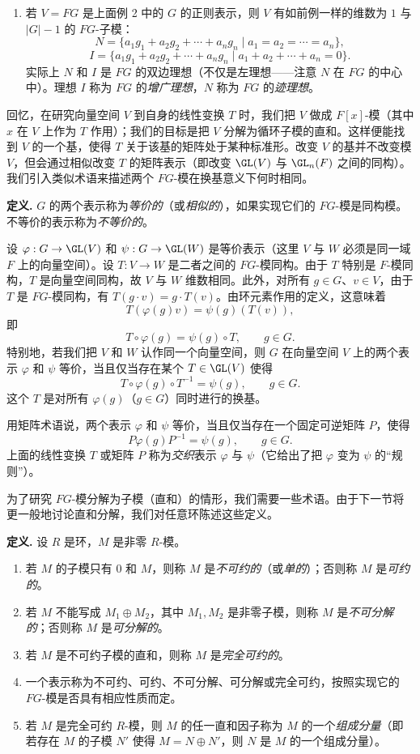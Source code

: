 \begin{enumerate}[label=(\arabic*)]
  \item 若 $V=FG$ 是上面例 2 中的 $G$ 的正则表示，则 $V$ 有如前例一样的维数为 $1$ 与 $|G|-1$ 的 $FG$-子模：
  \[
    N=\{a_1g_1+a_2g_2+\cdots+a_ng_n\mid a_1=a_2=\cdots=a_n\},
  \]
  \[
    I=\{a_1g_1+a_2g_2+\cdots+a_ng_n\mid a_1+a_2+\cdots+a_n=0\}.
  \]
  实际上 $N$ 和 $I$ 是 $FG$ 的双边理想（不仅是左理想——注意 $N$ 在 $FG$ 的中心中）。理想 $I$ 称为 $FG$ 的\emph{增广理想}，$N$ 称为 $FG$ 的\emph{迹理想}。
\end{enumerate}

回忆，在研究向量空间 $V$ 到自身的线性变换 $T$ 时，我们把 $V$ 做成 $F[x]$-模（其中 $x$ 在 $V$ 上作为 $T$ 作用）；我们的目标是把 $V$ 分解为循环子模的直和。这样便能找到 $V$ 的一个基，使得 $T$ 关于该基的矩阵处于某种标准形。改变 $V$ 的基并不改变模 $V$，但会通过相似改变 $T$ 的矩阵表示（即改变 $\GL(V)$ 与 $\GL_n(F)$ 之间的同构）。我们引入类似术语来描述两个 $FG$-模在换基意义下何时相同。

\noindent\textbf{定义.} $G$ 的两个表示称为\emph{等价的}（或\emph{相似的}），如果实现它们的 $FG$-模是同构模。不等价的表示称为\emph{不等价的}。

设 $\varphi:G\to\GL(V)$ 和 $\psi:G\to\GL(W)$ 是等价表示（这里 $V$ 与 $W$ 必须是同一域 $F$ 上的向量空间）。设 $T:V\to W$ 是二者之间的 $FG$-模同构。由于 $T$ 特别是 $F$-模同构，$T$ 是向量空间同构，故 $V$ 与 $W$ 维数相同。此外，对所有 $g\in G$、$v\in V$，由于 $T$ 是 $FG$-模同构，有 $T(g\cdot v)=g\cdot T(v)$。由环元素作用的定义，这意味着
\[
  T(\varphi(g)v)=\psi(g)(T(v)),
\]
即
\[
  T\circ\varphi(g)=\psi(g)\circ T,
  \qquad g\in G.
\]
特别地，若我们把 $V$ 和 $W$ 认作同一个向量空间，则 $G$ 在向量空间 $V$ 上的两个表示 $\varphi$ 和 $\psi$ 等价，当且仅当存在某个 $T\in\GL(V)$ 使得
\[
  T\circ\varphi(g)\circ T^{-1}=\psi(g),
  \qquad g\in G.
\]
这个 $T$ 是对所有 $\varphi(g)$（$g\in G$）同时进行的换基。

用矩阵术语说，两个表示 $\varphi$ 和 $\psi$ 等价，当且仅当存在一个固定可逆矩阵 $P$，使得
\[
  P\varphi(g)P^{-1}=\psi(g),
  \qquad g\in G.
\]
上面的线性变换 $T$ 或矩阵 $P$ 称为\emph{交织}表示 $\varphi$ 与 $\psi$（它给出了把 $\varphi$ 变为 $\psi$ 的“规则”）。

为了研究 $FG$-模分解为子模（直和）的情形，我们需要一些术语。由于下一节将更一般地讨论直和分解，我们对任意环陈述这些定义。

\noindent\textbf{定义.} 设 $R$ 是环，$M$ 是非零 $R$-模。
\begin{enumerate}[label=(\arabic*)]
  \item 若 $M$ 的子模只有 $0$ 和 $M$，则称 $M$ 是\emph{不可约的}（或\emph{单的}）；否则称 $M$ 是\emph{可约的}。
  \item 若 $M$ 不能写成 $M_1\oplus M_2$，其中 $M_1,M_2$ 是非零子模，则称 $M$ 是\emph{不可分解的}；否则称 $M$ 是\emph{可分解的}。
  \item 若 $M$ 是不可约子模的直和，则称 $M$ 是\emph{完全可约的}。
  \item 一个表示称为不可约、可约、不可分解、可分解或完全可约，按照实现它的 $FG$-模是否具有相应性质而定。
  \item 若 $M$ 是完全可约 $R$-模，则 $M$ 的任一直和因子称为 $M$ 的一个\emph{组成分量}（即若存在 $M$ 的子模 $N'$ 使得 $M=N\oplus N'$，则 $N$ 是 $M$ 的一个组成分量）。
\end{enumerate}

